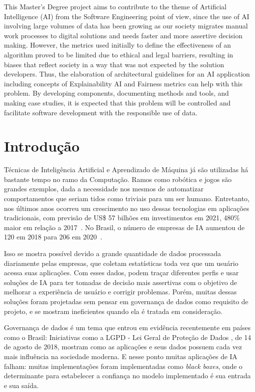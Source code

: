 \documentclass[portugues, 12pt, a4paper]{article}
\begin{document}
This Master's Degree project aims to contribute to the theme of Artificial Intelligence (AI) from the Software Engineering point of view, since the use of AI involving large volumes of data has been growing as our society migrates manual work processes to digital solutions and needs faster and more assertive decision making. However, the metrics used initially to define the effectiveness of an algorithm proved to be limited due to ethical and legal barriers, resulting in biases that reflect society in a way that was not expected by the solution developers. Thus, the elaboration of architectural guidelines for an AI application including concepts of Explainability AI and Fairness metrics can help with this problem. By developing components, documenting methods and tools, and making case studies, it is expected that this problem will be controlled and facilitate software development with the responsible use of data.
\newpage

\thispagestyle{secondstyle}

\section{Introdução}

Técnicas de Inteligência Artificial e Aprendizado de Máquina já são utilizadas há bastante tempo no ramo da Computação. Ramos como robótica e jogos são grandes exemplos, dada a necessidade nos mesmos de automatizar comportamentos que seriam tidos como triviais para um ser humano. Entretanto, nos últimos anos ocorreu um crescimento no uso dessas tecnologias em aplicações tradicionais, com previsão de US\$ 57 bilhões em investimentos em 2021, 480\% maior em relação a 2017~\citep{Deloitte_2018}. No Brasil, o número de empresas de IA aumentou de 120 em 2018 para 206 em 2020~\citep{CIO_2021}.

Isso se mostra possível devido a grande quantidade de dados processada diariamente pelas empresas, que coletam estatísticas toda vez que um usuário acessa suas aplicações. Com esses dados, podem traçar diferentes perfis e usar soluções de IA para ter tomadas de decisão mais assertivas com o objetivo de melhorar a experiência de usuário e corrigir problemas. Porém, muitas dessas soluções foram projetadas sem pensar em governança de dados como requisito de projeto, e se mostram ineficientes quando ela é tratada em consideração.

Governança de dados é um tema que entrou em evidência recentemente em países como o Brasil: Iniciativas como a LGPD - Lei Geral de Proteção de Dados \citep{LGPD_2021}, de 14 de agosto de 2018, mostram como as aplicações e seus dados possuem cada vez mais influência na sociedade moderna. E nesse ponto muitas aplicações de IA falham: muitas implementações foram implementadas como \textit{black boxes}, onde o determinante para estabelecer a confiança no modelo implementado é sua entrada e sua saída.
\end{document}
